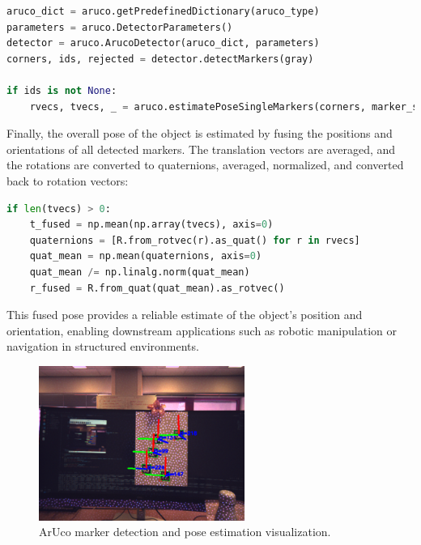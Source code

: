 \begin{lstlisting}[basicstyle=\ttfamily\scriptsize, language=Python]
aruco_dict = aruco.getPredefinedDictionary(aruco_type)
parameters = aruco.DetectorParameters()
detector = aruco.ArucoDetector(aruco_dict, parameters)
corners, ids, rejected = detector.detectMarkers(gray)

if ids is not None:
    rvecs, tvecs, _ = aruco.estimatePoseSingleMarkers(corners, marker_size, mtx, dist)
\end{lstlisting}

\noindent Finally, the overall pose of the object is estimated by fusing the positions and orientations of all detected markers. 
The translation vectors are averaged, and the rotations are converted to quaternions, averaged, normalized, and converted back to rotation vectors:

\begin{lstlisting}[basicstyle=\ttfamily\scriptsize, language=Python]
if len(tvecs) > 0:
    t_fused = np.mean(np.array(tvecs), axis=0)
    quaternions = [R.from_rotvec(r).as_quat() for r in rvecs]
    quat_mean = np.mean(quaternions, axis=0)
    quat_mean /= np.linalg.norm(quat_mean)
    r_fused = R.from_quat(quat_mean).as_rotvec()
\end{lstlisting}

\noindent This fused pose provides a reliable estimate of the object's position and orientation, enabling downstream applications such as robotic manipulation or navigation in structured environments.

\begin{figure}[H]
    \centering
    \includegraphics[width=0.6\textwidth]{figs/aruco_det.png}
    \caption{ArUco marker detection and pose estimation visualization.}
    \label{fig:aruco_detection}
\end{figure}